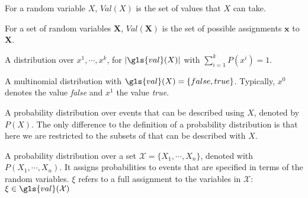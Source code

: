 {%
  For a \gls{random variable} $X$, $Val(X)$ is the set of values that $X$ can take.

  For a \gls{set of random variables} $\bm{X}$, $Val(\bm{X})$ is the set of possible assignments $\bm{x}$ to $\bm{X}$.
}

{%
  A distribution over $x^1,\cdots,x^k$, for $\lvert\gls{val}(X)\rvert$ with $\sum_{i=1}^k P(x^i)=1$.
}

{%
  A \gls{multinomial distribution} with $\gls{val}(X)=\{false,true\}$. Typically, $x^0$ denotes the value \textit{false} and $x^1$ the value \textit{true}.
}

{%
  A \gls{probability distribution} over events that can be described using $X$, denoted by $P(X)$. The only difference to the definition of a \gls{probability distribution} is that here we are restricted to the subsets of  that can be described with $X$.
}

{%
  A \gls{probability distribution} over a set $\mathcal{X}=\{X_1,\cdots,X_n\}$, denoted with $P(X_1,\cdots,X_n)$. It assigns probabilities to events that are specified in terms of the \glspl{random variable}. $\xi$ refers to a full assignment to the variables in $\mathcal{X}$: $\xi\in\gls{val}(\mathcal{X})$


}

